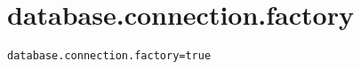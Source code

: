 \section{database.connection.factory}
\label{configuration:DatabaseConnectionFactory}
\AvailableInJavaOnly{\TODO}
\begin{lstlisting}[style=Props,caption={Usage example for \textit{database.connection.factory}}]
database.connection.factory=true
\end{lstlisting}